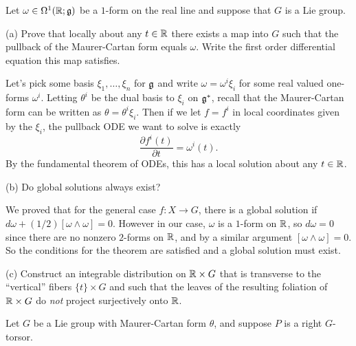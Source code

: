 \documentclass{../../templates/lkx_pset}
\begin{document}
\begin{problem}{3}
Let $\omega\in \Omega^1(\mathbb{R}; \mathfrak{g})$ be a $1$-form on the real line and suppose that $G$ is a Lie group.
\end{problem}

\begin{parts}
	\begin{part}{(a)}
		Prove that locally about any $t\in \mathbb{R}$ there exists a map into $G$ such that the pullback of the Maurer-Cartan form equals $\omega$. Write the first order differential equation this map satisfies.
	\end{part}

	Let's pick some basis $\xi_1,\ldots, \xi_n$ for $\mathfrak{g}$ and write $\omega = \omega^i\xi_i$ for some real valued one-forms $\omega^i$. Letting $\theta^i$ be the dual basis to $\xi_i$ on $\mathfrak{g}^*$, recall that the Maurer-Cartan form can be written as $\theta = \theta^i\xi_i$. Then if we let $f= f^i$ in local coordinates given by the $\xi_i$, the pullback ODE we want to solve is exactly 
	\[
    \frac{\partial f^i(t)}{\partial t} = \omega^i(t).
	\]
	By the fundamental theorem of ODEs, this has a local solution about any $t\in \mathbb{R}$.

	\begin{part}{(b)}
		Do global solutions always exist?
	\end{part}

	We proved that for the general case $f : X \to G$, there is a global solution if $d\omega + (1/2)[\omega\wedge \omega]=0$. However in our case, $\omega$ is a $1$-form on $\mathbb{R}$, so $d\omega = 0$ since there are no nonzero $2$-forms on $\mathbb{R}$, and by a similar argument $[\omega\wedge \omega]=0$. So the conditions for the theorem are satisfied and a global solution must exist.

	\begin{part}{(c)}
		Construct an integrable distribution on $\mathbb{R}\times G$ that is transverse to the ``vertical'' fibers $\{t\}\times G$ and such that the leaves of the resulting foliation of $\mathbb{R}\times G$ do \emph{not} project surjectively onto $\mathbb{R}$.
	\end{part}
\end{parts}

\begin{problem}{4}
Let $G$ be a Lie group with Maurer-Cartan form $\theta$, and suppose $P$ is a right $G$-torsor.
\end{problem}
\end{document}
